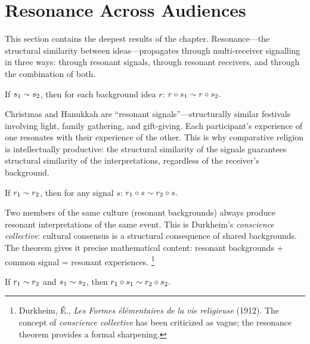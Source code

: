 \section{Resonance Across Audiences}
\label{sec:mr-resonance}

This section contains the deepest results of the chapter.  Resonance---the
structural similarity between ideas---propagates through multi-receiver
signalling in three ways: through resonant signals, through resonant
receivers, and through the combination of both.

\begin{theorem}
\label{thm:resonant-signals-same}
If $s_1\sim s_2$, then for each background idea $r$:
$r\circ s_1 \sim r\circ s_2.$
\end{theorem}

Christmas and Hanukkah are ``resonant signals''---structurally similar
festivals involving light, family gathering, and gift-giving.  Each
participant's experience of one resonates with their experience of the
other.  This is why comparative religion is intellectually productive: the
structural similarity of the signals guarantees structural similarity of the
interpretations, regardless of the receiver's background.

\begin{theorem}
\label{thm:same-signal-resonant}
If $r_1\sim r_2$, then for any signal $s$:
$r_1\circ s \sim r_2\circ s.$
\end{theorem}

Two members of the same culture (resonant backgrounds) always produce
resonant interpretations of the same event.  This is Durkheim's
\emph{conscience collective}: cultural consensus is a structural consequence
of shared backgrounds.  The theorem gives it precise mathematical content:
resonant backgrounds + common signal = resonant experiences.%
\footnote{Durkheim, \'E., \textit{Les Formes \'el\'ementaires de la vie
religieuse} (1912).  The concept of \emph{conscience collective} has been
criticized as vague; the resonance theorem provides a formal sharpening.}

\begin{theorem}
\label{thm:full-resonance}
If $r_1\sim r_2$ and $s_1\sim s_2$, then
$r_1\circ s_1 \sim r_2\circ s_2.$
\end{theorem}

